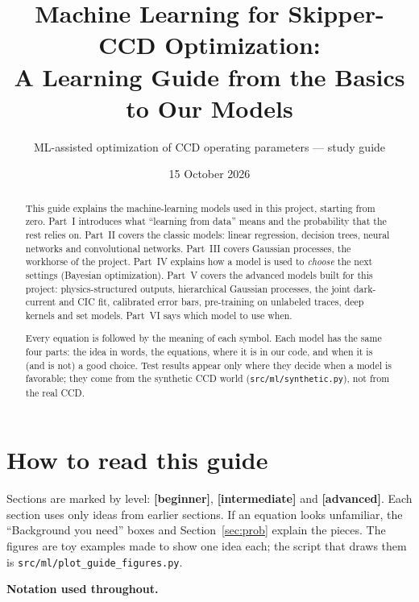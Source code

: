 \documentclass[11pt]{article}
\title{Machine Learning for Skipper-CCD Optimization:\\ A Learning Guide from the Basics to Our Models}
\author{ML-assisted optimization of CCD operating parameters --- study guide}
\date{15 October 2026}
\newcommand{\code}[1]{\texttt{#1}}
\begin{document}
\maketitle

\begin{abstract}
This guide explains the machine-learning models used in this project, starting from zero. Part~I introduces what
``learning from data'' means and the probability that the rest relies on. Part~II covers the classic models: linear
regression, decision trees, neural networks and convolutional networks. Part~III covers Gaussian processes, the workhorse
of the project. Part~IV explains how a model is used to \emph{choose} the next settings (Bayesian optimization). Part~V
covers the advanced models built for this project: physics-structured outputs, hierarchical Gaussian processes, the
joint dark-current and CIC fit, calibrated error bars, pre-training on unlabeled traces, deep kernels and set models.
Part~VI says which model to use when.

Every equation is followed by the meaning of each symbol. Each model has the same four parts: the idea in words, the
equations, where it is in our code, and when it is (and is not) a good choice. Test results appear only where they
decide when a model is favorable; they come from the synthetic CCD world (\code{src/ml/synthetic.py}), not from the real
CCD.
\end{abstract}

\tableofcontents
\clearpage

\section*{How to read this guide}

Sections are marked by level: \textbf{[beginner]}, \textbf{[intermediate]} and \textbf{[advanced]}. Each section uses only
ideas from earlier sections. If an equation looks unfamiliar, the ``Background you need'' boxes and Section~\ref{sec:prob}
explain the pieces. The figures are toy examples made to show one idea each; the script that draws them is
\code{src/ml/plot\_guide\_figures.py}.

\medskip\noindent\textbf{Notation used throughout.}
\end{document}
